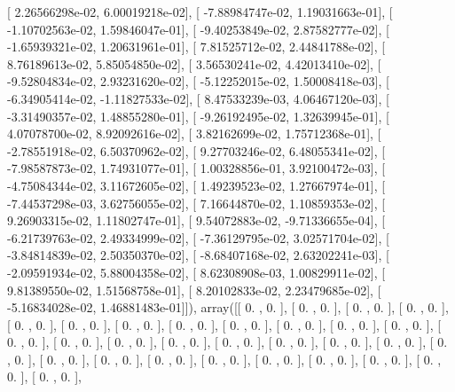 \documentclass{article}
\begin{document}
       [  2.26566298e-02,   6.00019218e-02],
       [ -7.88984747e-02,   1.19031663e-01],
       [ -1.10702563e-02,   1.59846047e-01],
       [ -9.40253849e-02,   2.87582777e-02],
       [ -1.65939321e-02,   1.20631961e-01],
       [  7.81525712e-02,   2.44841788e-02],
       [  8.76189613e-02,   5.85054850e-02],
       [  3.56530241e-02,   4.42013410e-02],
       [ -9.52804834e-02,   2.93231620e-02],
       [ -5.12252015e-02,   1.50008418e-03],
       [ -6.34905414e-02,  -1.11827533e-02],
       [  8.47533239e-03,   4.06467120e-03],
       [ -3.31490357e-02,   1.48855280e-01],
       [ -9.26192495e-02,   1.32639945e-01],
       [  4.07078700e-02,   8.92092616e-02],
       [  3.82162699e-02,   1.75712368e-01],
       [ -2.78551918e-02,   6.50370962e-02],
       [  9.27703246e-02,   6.48055341e-02],
       [ -7.98587873e-02,   1.74931077e-01],
       [  1.00328856e-01,   3.92100472e-03],
       [ -4.75084344e-02,   3.11672605e-02],
       [  1.49239523e-02,   1.27667974e-01],
       [ -7.44537298e-03,   3.62756055e-02],
       [  7.16644870e-02,   1.10859353e-02],
       [  9.26903315e-02,   1.11802747e-01],
       [  9.54072883e-02,  -9.71336655e-04],
       [ -6.21739763e-02,   2.49334999e-02],
       [ -7.36129795e-02,   3.02571704e-02],
       [ -3.84814839e-02,   2.50350370e-02],
       [ -8.68407168e-02,   2.63202241e-03],
       [ -2.09591934e-02,   5.88004358e-02],
       [  8.62308908e-03,   1.00829911e-02],
       [  9.81389550e-02,   1.51568758e-01],
       [  8.20102833e-02,   2.23479685e-02],
       [ -5.16834028e-02,   1.46881483e-01]]), array([[ 0.        ,  0.        ],
       [ 0.        ,  0.        ],
       [ 0.        ,  0.        ],
       [ 0.        ,  0.        ],
       [ 0.        ,  0.        ],
       [ 0.        ,  0.        ],
       [ 0.        ,  0.        ],
       [ 0.        ,  0.        ],
       [ 0.        ,  0.        ],
       [ 0.        ,  0.        ],
       [ 0.        ,  0.        ],
       [ 0.        ,  0.        ],
       [ 0.        ,  0.        ],
       [ 0.        ,  0.        ],
       [ 0.        ,  0.        ],
       [ 0.        ,  0.        ],
       [ 0.        ,  0.        ],
       [ 0.        ,  0.        ],
       [ 0.        ,  0.        ],
       [ 0.        ,  0.        ],
       [ 0.        ,  0.        ],
       [ 0.        ,  0.        ],
       [ 0.        ,  0.        ],
       [ 0.        ,  0.        ],
       [ 0.        ,  0.        ],
       [ 0.        ,  0.        ],
       [ 0.        ,  0.        ],
       [ 0.        ,  0.        ],
       [ 0.        ,  0.        ],
       [ 0.        ,  0.        ],
\end{document}
